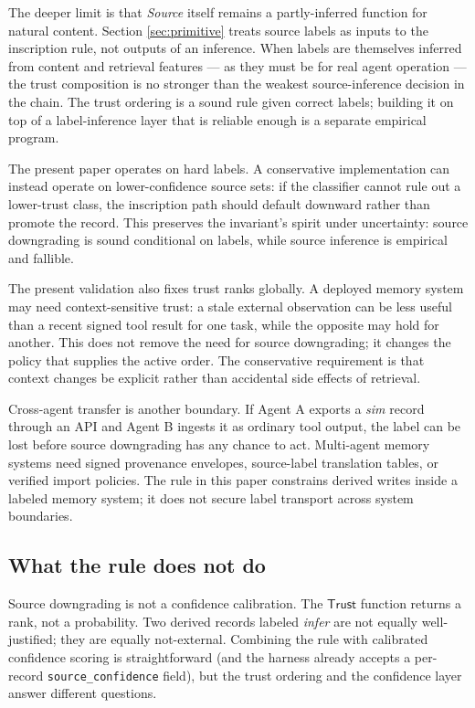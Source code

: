\documentclass[11pt]{article}
\newcommand{\Trust}{\mathsf{Trust}}
\begin{document}
The deeper limit is that \emph{Source} itself remains a partly-inferred function for natural content. Section \ref{sec:primitive} treats source labels as inputs to the inscription rule, not outputs of an inference. When labels are themselves inferred from content and retrieval features --- as they must be for real agent operation \cite{Carboni2026SourceInf} --- the trust composition is no stronger than the weakest source-inference decision in the chain. The trust ordering is a sound rule given correct labels; building it on top of a label-inference layer that is reliable enough is a separate empirical program.

The present paper operates on hard labels. A conservative implementation can instead operate on lower-confidence source sets: if the classifier cannot rule out a lower-trust class, the inscription path should default downward rather than promote the record. This preserves the invariant's spirit under uncertainty: source downgrading is sound conditional on labels, while source inference is empirical and fallible.

The present validation also fixes trust ranks globally. A deployed memory system may need context-sensitive trust: a stale external observation can be less useful than a recent signed tool result for one task, while the opposite may hold for another. This does not remove the need for source downgrading; it changes the policy that supplies the active order. The conservative requirement is that context changes be explicit rather than accidental side effects of retrieval.

Cross-agent transfer is another boundary. If Agent A exports a \emph{sim} record through an API and Agent B ingests it as ordinary tool output, the label can be lost before source downgrading has any chance to act. Multi-agent memory systems need signed provenance envelopes, source-label translation tables, or verified import policies. The rule in this paper constrains derived writes inside a labeled memory system; it does not secure label transport across system boundaries.

\subsection{What the rule does not do}

Source downgrading is not a confidence calibration. The $\Trust$ function returns a rank, not a probability. Two derived records labeled \emph{infer} are not equally well-justified; they are equally not-external. Combining the rule with calibrated confidence scoring is straightforward (and the harness already accepts a per-record \texttt{source\_confidence} field), but the trust ordering and the confidence layer answer different questions.
\end{document}
